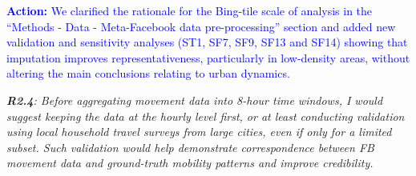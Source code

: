 \documentclass[12pt,a4paper,oneside, reqno]{amsart}
\begin{document}
\textcolor{blue}{\textbf{Action:} We clarified the rationale for the Bing-tile scale of analysis in the ``Methods - Data - Meta-Facebook data pre-processing'' section and added new validation and sensitivity analyses (ST1, SF7, SF9, SF13 and SF14) showing that imputation improves representativeness, particularly in low-density areas, without altering the main conclusions relating to urban dynamics.}

\setlength{\leftskip}{0cm} \textit{\textbf{R2.4}: Before aggregating movement data into 8-hour time windows, I would suggest keeping the data at the hourly level first, or at least conducting validation using local household travel surveys from large cities, even if only for a limited subset. Such validation would help demonstrate correspondence between FB movement data and ground-truth mobility patterns and improve credibility.}
\end{document}
